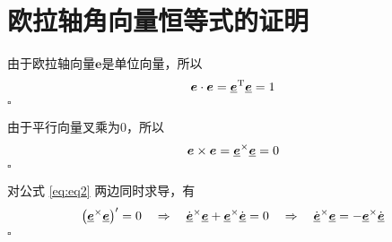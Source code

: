 \section{欧拉轴角向量恒等式的证明}
\label{欧拉轴角向量恒等式的证明}
\sssection[$\ubm{e}^\T \ubm{e} = 1$]
\vspace*{-0.8em}

\proof 由于欧拉轴向量$\bm{e}$是单位向量，所以
\begin{equation}
	\bm{e} \cdot \bm{e} = \underline{\bm{e}}^{\text{T}} \underline{\bm{e}} = 1
\end{equation}
\hfill $\square$


\sssection[$\ubm{e}^\times \ubm{e} = 0$]
\vspace*{-0.8em}

\proof 由于平行向量叉乘为0，所以
\begin{equation}
	\bm{e} \times \bm{e} = \underline{\bm{e}}^\times \underline{\bm{e}} = 0
	\label{eq:eq2}
\end{equation}
\hfill $\square$


\sssection[$\ubm{e}^\times \ubm{e} = 0$]
\vspace*{-0.8em}

\proof 对公式 \eqref{eq:eq2} 两边同时求导，有
\begin{equation}
	\big( \underline{\bm{e}}^\times \underline{\bm{e}} \big)' = 0 \quad \Rightarrow \quad \dot{\underline{\bm{e}}}^\times \underline{\bm{e}} + \underline{\bm{e}}^\times \dot{\underline{\bm{e}}} = 0 \quad \Rightarrow \quad \dot{\underline{\bm{e}}}^\times \underline{\bm{e}} =  -\underline{\bm{e}}^\times \dot{\underline{\bm{e}}}
\end{equation}
\hfill $\square$


\sssection[$\dot{\ubm{e}^\times} \ubm{e}^\times = \ubm{e}\dot{\ubm{e}}^\T$]
\vspace*{-0.8em}

